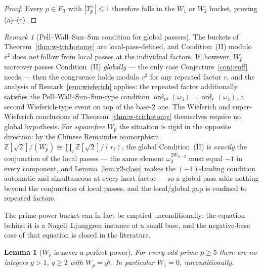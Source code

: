 \documentclass[11pt]{amsart}
\theoremstyle{plain}
\newtheorem{lemma}[theorem]{Lemma}
\theoremstyle{definition}
\theoremstyle{remark}
\newtheorem{remark}[theorem]{Remark}
\numberwithin{equation}{section}
\newcommand{\ord}{\operatorname{ord}}
\newcommand{\Z}{\mathbb{Z}}
\begin{document}
\begin{proof}
Every $p \in E_3$ with $|T_p^{>}| \leq 1$ therefore falls in the $W_1$ or $W_2$ bucket, proving (a)--(c).
\end{proof}

\begin{remark}[Pell--Wall--Sun--Sun condition for global passers]\label{rem:pell-wss-global}
The buckets of Theorem~\ref{thm:w-trichotomy} are local-pass-defined, and Condition~(II) modulo $r^2$ does \emph{not} follow from local passes at the individual factors. If, however, $W_p$ moreover passes Condition~(II) \emph{globally} --- the only case Conjecture~\ref{conj:suff} needs --- then the congruence holds modulo $r^2$ for any repeated factor $r$, and the analysis of Remark~\ref{rem:wieferich} applies: the repeated factor additionally satisfies the Pell--Wall--Sun--Sun-type condition $\ord_{r^2}(\omega_3) = \ord_r(\omega_3)$, a second Wieferich-type event on top of the base-$2$ one. The Wieferich and super-Wieferich conclusions of Theorem~\ref{thm:w-trichotomy} themselves require no global hypothesis. For \emph{squarefree} $W_p$ the situation is rigid in the opposite direction: by the Chinese Remainder isomorphism $\Z[\sqrt 2]/(W_p) \cong \prod_i \Z[\sqrt 2]/(r_i)$, the global Condition~(II) is \emph{exactly} the conjunction of the local passes --- the same element $\omega_3^{2 W_{p-2}}$ must equal $-1$ in every component, and Lemma~\ref{lem:v2-class} makes the $(-1)$-landing condition automatic and simultaneous at every inert factor --- so a global pass adds nothing beyond the conjunction of local passes, and the local/global gap is confined to repeated factors.
\end{remark}

The prime-power bucket can in fact be emptied unconditionally: the equation behind it is a Nagell--Ljunggren instance at a small base, and the negative-base case of that equation is closed in the literature.

\begin{lemma}[$W_p$ is never a perfect power]\label{lem:w1-empty}
For every odd prime $p \geq 5$ there are no integers $y > 1$, $q \geq 2$ with $W_p = y^q$. In particular $W_1 = 0$, unconditionally.
\end{lemma}
\end{document}
